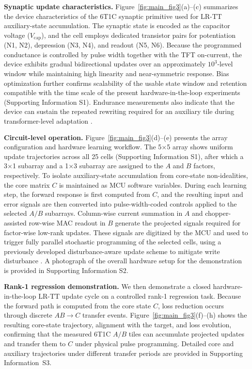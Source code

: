 \documentclass[AMA,LATO2COL]{WileyNJDv5}
\begin{document}
\noindent\textbf{Synaptic update characteristics.}
Figure~\ref{fig:main_fig3}(a)--(c) summarizes the device characteristics of the 6T1C synaptic primitive used for LR-TT auxiliary-state accumulation. The synaptic state is encoded as the capacitor voltage ($V_{\mathrm{cap}}$), and the cell employs dedicated transistor pairs for potentiation (N1, N2), depression (N3, N4), and readout (N5, N6). Because the programmed conductance is controlled by pulse width together with the TFT on-current, the device exhibits gradual bidirectional updates over an approximately $10^{3}$-level window while maintaining high linearity and near-symmetric response. Bias optimization further confirms scalability of the usable state window and retention compatible with the time scale of the present hardware-in-the-loop experiments (Supporting Information S1). Endurance measurements also indicate that the device can sustain the repeated rewriting required for an auxiliary tile during transformer-level adaptation \cite{ambrogio2018analogtraining,li2018insitu,legallo2018mixedprecision,mackin2022weightprogramming,won2023advs_6t1c,kang2025advs_disturbance}.

\noindent\textbf{Circuit-level operation.}
Figure~\ref{fig:main_fig3}(d)--(e) presents the array configuration and hardware learning workflow. The 5$\times$5 array shows uniform update trajectories across all 25 cells (Supporting Information S1), after which a 3$\times$1 subarray and a 1$\times$3 subarray are assigned to the $A$ and $B$ factors, respectively. To isolate auxiliary-state accumulation from core-state non-idealities, the core matrix $C$ is maintained as MCU software variables. During each learning step, the forward response is first computed from $C$, and the resulting input and error signals are then converted into pulse-width-coded controls applied to the selected $A/B$ subarrays. Column-wise current summation in $A$ and chopper-assisted row-wise MAC readout in $B$ generate the projected signals required for factor-wise low-rank updates. These signals are digitized by the MCU and used to trigger fully parallel stochastic programming of the selected cells, using a previously developed disturbance-aware update scheme to mitigate write disturbance \cite{won2023advs_6t1c,kang2025advs_disturbance}. A photograph of the overall hardware setup for the demonstration is provided in Supporting Information S2.

\noindent\textbf{Rank-1 regression demonstration.}
We then demonstrate a closed hardware-in-the-loop LR-TT update cycle on a controlled rank-1 regression task.
Because the forward path is computed from the core state \(C\), loss reduction occurs through discrete \(AB\!\rightarrow C\) transfer events.
Figure~\ref{fig:main_fig3}(f)--(h) shows the resulting core-state trajectory, alignment with the target, and loss evolution, confirming that the measured 6T1C \(A/B\) tiles can accumulate projected updates and transfer them to \(C\) under physical pulse programming.
Detailed core and auxiliary trajectories under different transfer periods are provided in Supporting Information~S3.
\end{document}
